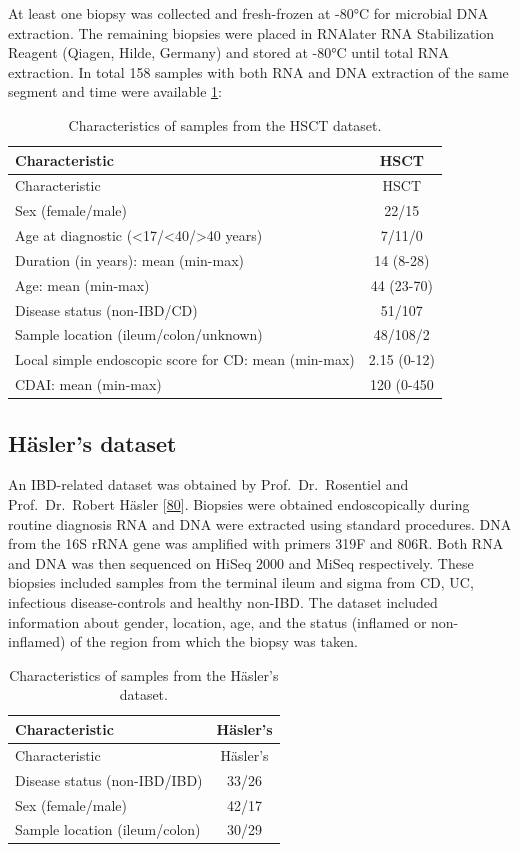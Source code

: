 \documentclass[
  12pt,
  a4paper,
  twoside,
  openright]{book}
\begin{document}
At least one biopsy was collected and fresh-frozen at -80°C for microbial DNA extraction.
The remaining biopsies were placed in RNAlater RNA Stabilization Reagent (Qiagen, Hilde, Germany) and stored at -80°C until total RNA extraction.
In total 158 samples with both RNA and DNA extraction of the same segment and time were available \ref{tab:HSCT}:

\begin{longtable}[]{@{}lc@{}}
\caption{\label{tab:HSCT} Characteristics of samples from the HSCT dataset.}\tabularnewline
\toprule
Characteristic & HSCT \\
\midrule
\endfirsthead
\toprule
Characteristic & HSCT \\
\midrule
\endhead
Sex (female/male) & 22/15 \\
Age at diagnostic (\textless17/\textless40/\textgreater40 years) & 7/11/0 \\
Duration (in years): mean (min-max) & 14 (8-28) \\
Age: mean (min-max) & 44 (23-70) \\
Disease status (non-IBD/CD) & 51/107 \\
Sample location (ileum/colon/unknown) & 48/108/2 \\
Local simple endoscopic score for CD: mean (min-max) & 2.15 (0-12) \\
CDAI: mean (min-max) & 120 (0-450 \\
\bottomrule
\end{longtable}

\hypertarget{methods-hasler}{%
\subsection{Häsler's dataset}\label{methods-hasler}}

An IBD-related dataset was obtained by Prof.~Dr.~Rosentiel and Prof.~Dr.~Robert Häsler {[}\protect\hyperlink{ref-hasler_uncoupling_2016}{80}{]}.
Biopsies were obtained endoscopically during routine diagnosis RNA and DNA were extracted using standard procedures.
DNA from the 16S rRNA gene was amplified with primers 319F and 806R.
Both RNA and DNA was then sequenced on HiSeq 2000 and MiSeq respectively.
These biopsies included samples from the terminal ileum and sigma from CD, UC, infectious disease-controls and healthy non-IBD.
The dataset included information about gender, location, age, and the status (inflamed or non-inflamed) of the region from which the biopsy was taken.

\begin{longtable}[]{@{}lc@{}}
\caption{\label{tab:Hasler} Characteristics of samples from the Häsler's dataset.}\tabularnewline
\toprule
Characteristic & Häsler's \\
\midrule
\endfirsthead
\toprule
Characteristic & Häsler's \\
\midrule
\endhead
Disease status (non-IBD/IBD) & 33/26 \\
Sex (female/male) & 42/17 \\
Sample location (ileum/colon) & 30/29 \\
\bottomrule
\end{longtable}
\end{document}
